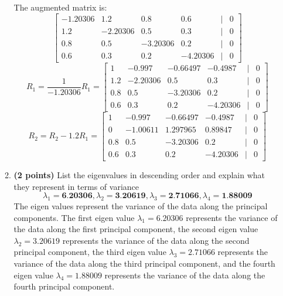\documentclass[a3paper,12pt]{extarticle} %
\begin{document}
\begin{enumerate}
\begin{enumerate}
\[        \]
        The augmented matrix is:
        \[
        \begin{bmatrix}-1.20306 & 1.2 & 0.8 & 0.6 & | & 0\\1.2 & -2.20306 & 0.5 & 0.3 & | & 0\\0.8 & 0.5 & -3.20306 & 0.2 & | & 0\\0.6 & 0.3 & 0.2 & -4.20306 & | & 0\end{bmatrix}
        \]
        \[
        R_1 = \frac{1}{-1.20306}R_1 = \begin{bmatrix}1 & -0.997 & -0.66497 & -0.4987 & | & 0\\1.2 & -2.20306 & 0.5 & 0.3 & | & 0\\0.8 & 0.5 & -3.20306 & 0.2 & | & 0\\0.6 & 0.3 & 0.2 & -4.20306 & | & 0\end{bmatrix}
        \]
        \[
        R_2 = R_2 - 1.2R_1 = \begin{bmatrix}1 & -0.997 & -0.66497 & -0.4987 & | & 0\\0 & -1.00611 & 1.297965 & 0.89847 & | & 0\\0.8 & 0.5 & -3.20306 & 0.2 & | & 0\\0.6 & 0.3 & 0.2 & -4.20306 & | & 0\end{bmatrix}
        \]
        \item \textbf{(2 points)} List the eigenvalues in descending order and explain what they represent in terms of variance
        \[
        \lambda_1 = \textbf{6.20306}, \lambda_2 = \textbf{3.20619}, \lambda_3 = \textbf{2.71066}, \lambda_4 = \textbf{1.88009}
        \]
        The eigen values represent the variance of the data along the principal components. The first eigen value \(\lambda_1 = 6.20306\) represents the variance of the data along the first principal component, the second eigen value \(\lambda_2 = 3.20619\) represents the variance of the data along the second principal component, the third eigen value \(\lambda_3 = 2.71066\) represents the variance of the data along the third principal component, and the fourth eigen value \(\lambda_4 = 1.88009\) represents the variance of the data along the fourth principal component.
    \end{enumerate} 
    
\end{enumerate}
\end{document}
